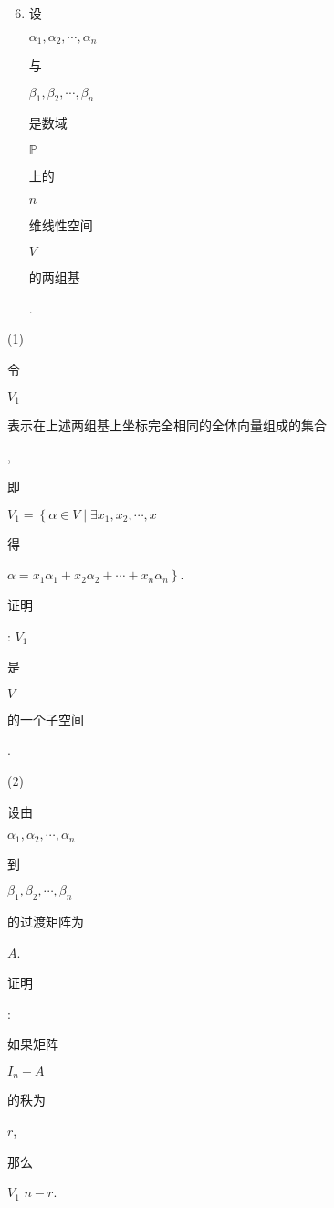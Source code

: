 \documentclass[10pt]{article}
\begin{document}
\begin{enumerate}
  \setcounter{enumi}{5}
  \item \begin{CJK}{UTF8}{mj}设\end{CJK} $\alpha_{1}, \alpha_{2}, \cdots, \alpha_{n}$ \begin{CJK}{UTF8}{mj}与\end{CJK} $\beta_{1}, \beta_{2}, \cdots, \beta_{n}$ \begin{CJK}{UTF8}{mj}是数域\end{CJK} $\mathbb{P}$ \begin{CJK}{UTF8}{mj}上的\end{CJK} $n$ \begin{CJK}{UTF8}{mj}维线性空间\end{CJK} $V$ \begin{CJK}{UTF8}{mj}的两组基\end{CJK}.
\end{enumerate}
(1) \begin{CJK}{UTF8}{mj}令\end{CJK} $V_{1}$ \begin{CJK}{UTF8}{mj}表示在上述两组基上坐标完全相同的全体向量组成的集合\end{CJK}, \begin{CJK}{UTF8}{mj}即\end{CJK} $V_{1}=\left\{\alpha \in V \mid \exists x_{1}, x_{2}, \cdots, x\right.$ \begin{CJK}{UTF8}{mj}得\end{CJK} $\left.\alpha=x_{1} \alpha_{1}+x_{2} \alpha_{2}+\cdots+x_{n} \alpha_{n}\right\}$. \begin{CJK}{UTF8}{mj}证明\end{CJK}: $V_{1}$ \begin{CJK}{UTF8}{mj}是\end{CJK} $V$ \begin{CJK}{UTF8}{mj}的一个子空间\end{CJK}.

(2) \begin{CJK}{UTF8}{mj}设由\end{CJK} $\alpha_{1}, \alpha_{2}, \cdots, \alpha_{n}$ \begin{CJK}{UTF8}{mj}到\end{CJK} $\beta_{1}, \beta_{2}, \cdots, \beta_{n}$ \begin{CJK}{UTF8}{mj}的过渡矩阵为\end{CJK} $A$. \begin{CJK}{UTF8}{mj}证明\end{CJK}: \begin{CJK}{UTF8}{mj}如果矩阵\end{CJK} $I_{n}-A$ \begin{CJK}{UTF8}{mj}的秩为\end{CJK} $r$, \begin{CJK}{UTF8}{mj}那么\end{CJK} $V_{1}$ $n-r$.
\end{document}
